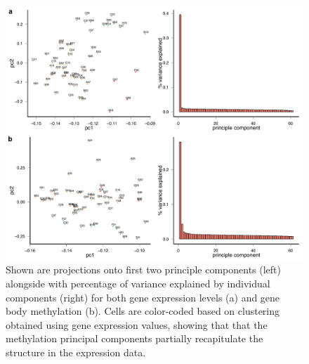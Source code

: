 \begin{figure}[htbp!]
\centering
\includegraphics[width=1.0\textwidth]{cca}
\caption[Principal-component analysis of gene body methylation and gene expression in serum-grown ESCs.]{Shown are projections onto first two principle components (left) alongside with percentage of variance explained by individual components (right) for both gene expression levels (a) and gene body methylation (b). Cells are color-coded based on clustering obtained using gene expression values, showing that that the methylation principal components partially recapitulate the structure in the expression data.}
\label{fig:mt_cca}
\end{figure}

